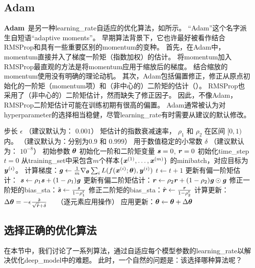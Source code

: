 \subsection{Adam}
\label{sec:adam}
\textbf{Adam}~\citep{kingma2014adam}是另一种\gls{learning_rate}自适应的优化算法，如所示。
``Adam''这个名字派生自短语``adaptive moments''。
早期算法背景下，它也许最好被看作结合RMSProp和具有一些重要区别的\gls{momentum}的变种。
首先，在Adam中，\gls{momentum}直接并入了梯度一阶矩（指数加权）的估计。
将\gls{momentum}加入RMSProp最直观的方法是将\gls{momentum}应用于缩放后的梯度。
结合缩放的\gls{momentum}使用没有明确的理论动机。
其次，Adam包括偏置修正，修正从原点初始化的一阶矩（\gls{momentum}项）和（非中心的）二阶矩的估计（）。
RMSProp也采用了（非中心的）二阶矩估计，然而缺失了修正因子。
因此，不像Adam，RMSProp二阶矩估计可能在训练初期有很高的偏置。
Adam通常被认为对\gls{hyperparameter}的选择相当稳健，尽管\gls{learning_rate}有时需要从建议的默认修改。

\begin{algorithm}[ht]
\caption{Adam算法}
\label{alg:adam}
\begin{algorithmic}
\REQUIRE 步长 $\epsilon$ （建议默认为： $0.001$）
\REQUIRE 矩估计的指数衰减速率， $\rho_1$ 和 $\rho_2$ 在区间 $[0, 1)$内。
（建议默认为：分别为$0.9$ 和 $0.999$）
\REQUIRE 用于数值稳定的小常数 $\delta$  （建议默认为： $10^{-8}$）
\REQUIRE 初始参数 $\boldsymbol{\theta}$
\STATE 初始化一阶和二阶矩变量 $\boldsymbol{\mathit{s}} = 0 $, $\boldsymbol{\mathit{r}} = 0$
\STATE 初始化\gls{time_step} $t=0$ 
    \STATE 从\gls{training_set}中采包含$m$个样本$\{ \boldsymbol{\mathit{x}}^{(1)},\dots, \boldsymbol{\mathit{x}}^{(m)}\}$ 的\gls{minibatch}，对应目标为$\boldsymbol{\mathit{y}}^{(i)}$。
    \STATE 计算梯度：$\boldsymbol{\mathit{g}} \leftarrow \frac{1}{m} \nabla_{\boldsymbol{\theta}} \sum_i L(f(\boldsymbol{\mathit{x}}^{(i)};\boldsymbol{\theta}),\boldsymbol{\mathit{y}}^{(i)})$ 
    \STATE $t \leftarrow t + 1$
    \STATE 更新有偏一阶矩估计： $\boldsymbol{\mathit{s}} \leftarrow \rho_1 \boldsymbol{\mathit{s}} + (1-\rho_1) \boldsymbol{\mathit{g}}$
    \STATE 更新有偏二阶矩估计：$\boldsymbol{\mathit{r}} \leftarrow \rho_2 \boldsymbol{\mathit{r}} + (1-\rho_2) \boldsymbol{\mathit{g}} \odot \boldsymbol{\mathit{g}}$
    \STATE 修正一阶矩的\gls{bias_sta}：$\hat{\boldsymbol{\mathit{s}}} \leftarrow \frac{\boldsymbol{\mathit{s}}}{1-\rho_1^t}$
    \STATE 修正二阶矩的\gls{bias_sta}：$\hat{\boldsymbol{\mathit{r}}} \leftarrow \frac{\boldsymbol{\mathit{r}}}{1-\rho_2^t}$
    \STATE 计算更新：$\Delta \boldsymbol{\theta} = - \epsilon \frac{\hat{\boldsymbol{\mathit{s}}}}{\sqrt{\hat{\boldsymbol{\mathit{r}}}} + \delta}$ \ \  （逐元素应用操作）
    \STATE 应用更新：$\boldsymbol{\theta} \leftarrow \boldsymbol{\theta} + \Delta \boldsymbol{\theta}$
\ENDWHILE
\end{algorithmic}
\end{algorithm}



\subsection{选择正确的优化算法}
\label{sec:choosing_the_right_optimization_algorithms}
在本节中，我们讨论了一系列算法，通过自适应每个模型参数的\gls{learning_rate}以解决优化\gls{deep_model}中的难题。
此时，一个自然的问题是：该选择哪种算法呢？

